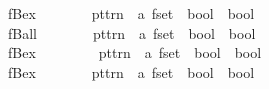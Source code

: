 \begin{isabellebody}
\ \ {\isachardoublequoteopen}{\isacharunderscore}fBex{}{\isachardoublequoteclose}\ \ \ \ \ \ \ {\isacharcolon}{\isacharcolon}\ {\isachardoublequoteopen}pttrn\ {\isasymRightarrow}\ {\isacharprime}a\ fset\ {\isasymRightarrow}\ bool\ {\isasymRightarrow}\ bool{\isachardoublequoteclose}\ \ \ \ \ \ {\isacharparenleft}{\isachardoublequoteopen}{\isacharparenleft}{}{\isacharquery}{\isacharbang}\ {\isacharparenleft}{\isacharunderscore}{\isacharslash}{\isacharcolon}{\isacharunderscore}{\isacharparenright}{\isachardot}{\isacharslash}\ {\isacharunderscore}{\isacharparenright}{\isachardoublequoteclose}\ {\isacharbrackleft}{}{\isacharcomma}\ {}{\isacharcomma}\ {}{}{\isacharbrackright}\ {}{}{\isacharparenright}\isanewline
\isanewline
{}\isamarkupfalse%
\isanewline
\ \ {\isachardoublequoteopen}{\isacharunderscore}fBall{\isachardoublequoteclose}\ \ \ \ \ \ \ {\isacharcolon}{\isacharcolon}\ {\isachardoublequoteopen}pttrn\ {\isasymRightarrow}\ {\isacharprime}a\ fset\ {\isasymRightarrow}\ bool\ {\isasymRightarrow}\ bool{\isachardoublequoteclose}\ \ \ \ \ \ {\isacharparenleft}{\isachardoublequoteopen}{\isacharparenleft}{}{\isasymforall}{\isacharparenleft}{\isacharunderscore}{\isacharslash}{\isacharbar}{\isasymin}{\isacharbar}{\isacharunderscore}{\isacharparenright}{\isachardot}{\isacharslash}\ {\isacharunderscore}{\isacharparenright}{\isachardoublequoteclose}\ {\isacharbrackleft}{}{\isacharcomma}\ {}{\isacharcomma}\ {}{}{\isacharbrackright}\ {}{}{\isacharparenright}\isanewline
\ \ {\isachardoublequoteopen}{\isacharunderscore}fBex{\isachardoublequoteclose}\ \ \ \ \ \ \ \ {\isacharcolon}{\isacharcolon}\ {\isachardoublequoteopen}pttrn\ {\isasymRightarrow}\ {\isacharprime}a\ fset\ {\isasymRightarrow}\ bool\ {\isasymRightarrow}\ bool{\isachardoublequoteclose}\ \ \ \ \ \ {\isacharparenleft}{\isachardoublequoteopen}{\isacharparenleft}{}{\isasymexists}{\isacharparenleft}{\isacharunderscore}{\isacharslash}{\isacharbar}{\isasymin}{\isacharbar}{\isacharunderscore}{\isacharparenright}{\isachardot}{\isacharslash}\ {\isacharunderscore}{\isacharparenright}{\isachardoublequoteclose}\ {\isacharbrackleft}{}{\isacharcomma}\ {}{\isacharcomma}\ {}{}{\isacharbrackright}\ {}{}{\isacharparenright}\isanewline
\ \ {\isachardoublequoteopen}{\isacharunderscore}fBex{}{\isachardoublequoteclose}\ \ \ \ \ \ \ {\isacharcolon}{\isacharcolon}\ {\isachardoublequoteopen}pttrn\ {\isasymRightarrow}\ {\isacharprime}a\ fset\ {\isasymRightarrow}\ bool\ {\isasymRightarrow}\ bool{\isachardoublequoteclose}\ \ \ \ \ \ {\isacharparenleft}{\isachardoublequoteopen}{\isacharparenleft}{}{\isasymexists}{\isacharbang}{\isacharparenleft}{\isacharunderscore}{\isacharslash}{\isacharbar}{\isasymin}{\isacharbar}{\isacharunderscore}{\isacharparenright}{\isachardot}{\isacharslash}\ {\isacharunderscore}{\isacharparenright}{\isachardoublequoteclose}\ {\isacharbrackleft}{}{\isacharcomma}\ {}{\isacharcomma}\ {}{}{\isacharbrackright}\ {}{}{\isacharparenright}\isanewline

\end{isabellebody}
